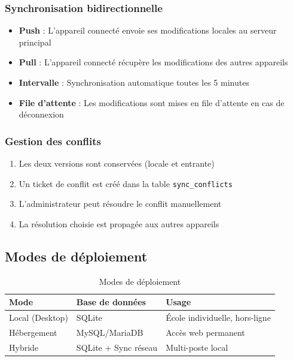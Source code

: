 \documentclass[12pt,a4paper,twoside]{report}
\begin{document}
\subsubsection{Synchronisation bidirectionnelle}

\begin{itemize}
    \item \textbf{Push} : L'appareil connecté envoie ses modifications locales au serveur principal
    \item \textbf{Pull} : L'appareil connecté récupère les modifications des autres appareils
    \item \textbf{Intervalle} : Synchronisation automatique toutes les 5 minutes
    \item \textbf{File d'attente} : Les modifications sont mises en file d'attente en cas de déconnexion
\end{itemize}

\subsubsection{Gestion des conflits}

\begin{enumerate}
    \item Les deux versions sont conservées (locale et entrante)
    \item Un ticket de conflit est créé dans la table \texttt{sync\_conflicts}
    \item L'administrateur peut résoudre le conflit manuellement
    \item La résolution choisie est propagée aux autres appareils
\end{enumerate}

\subsection{Modes de déploiement}

\begin{table}[h]
\centering
\caption{Modes de déploiement}
\begin{tabular}{lll}
\toprule
Mode & Base de données & Usage \\
\midrule
Local (Desktop) & SQLite & École individuelle, hors-ligne \\
Hébergement & MySQL/MariaDB & Accès web permanent \\
Hybride & SQLite + Sync réseau & Multi-poste local \\
\bottomrule
\end{tabular}
\end{table}
\end{document}
